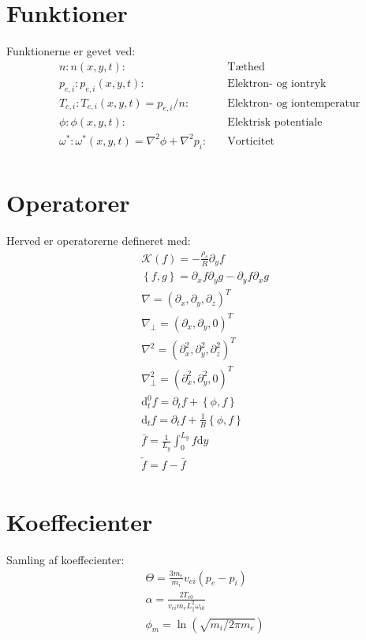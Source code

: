 \documentclass{article}
\begin{document}
\section{Funktioner}
Funktionerne er gevet ved:
\begin{align*}
    &n: n(x,y,t): &\text{Tæthed} \\
    &p_{e,i}: p_{e,i}(x,y,t): &\text{Elektron- og iontryk}  \\
    &T_{e,i}: T_{e,i}(x,y,t) = p_{e,i}/n: \quad &\text{Elektron- og iontemperatur} \\
    &\phi: \phi(x,y,t): \quad &\text{Elektrisk potentiale} \\
    &\omega^*: \omega^*(x,y,t) = \nabla^2\phi + \nabla^2 p_i: \quad &\text{Vorticitet} \\
\end{align*}


\section{Operatorer}
Herved er operatorerne defineret med:
\begin{gather}
    \mathcal{K}(f)= - \frac{\rho_s}{R}\partial_y f \label{curvature}\\
    \left\{ f, g\right\} = \partial_x f \partial_y g - \partial_y f \partial_x g \label{poission}\\
    \nabla = \left(\partial_x, \partial_y, \partial_z \right)^T \label{nabla}\\
    \nabla_\perp = \left(\partial_x, \partial_y, 0 \right)^T \label{nable_perp}\\
    \nabla^2 = \left(\partial^2_x, \partial^2_y, \partial^2_z \right)^T\label{nabla2}\\
    \nabla_\perp^2 = \left(\partial^2_x, \partial^2_y, 0 \right)^T\label{nabla2_perp}\\
    \mathrm{d}_t^0 f = \partial_t f + \left\{\phi, f \right\} \label{dt0}\\
    \mathrm{d}_t f = \partial_t f  + \frac{1}{B}  \left\{ \phi , f \right\} \label{dt} \\    
    \bar f = \frac{1}{L_y}\int_0^{L_y} f \mathrm{d}y \label{bar}\\
    \tilde f = f - \bar f\label{tilde}\\
\end{gather}


\section{Koeffecienter}
Samling af koeffecienter:
\begin{gather}
    \Theta = \frac{3m_e}{m_i}v_{ei}\left(p_e - p_i\right)\label{Theta}\\
    \alpha = \frac{2T_{e0}}{v_{ei}m_eL^2_\parallel\omega_{i0}}\label{alpha}\\
    \phi_m = \ln(\sqrt{m_i/2\pi m_e})\label{phi_m}\\
\end{gather}
\end{document}

